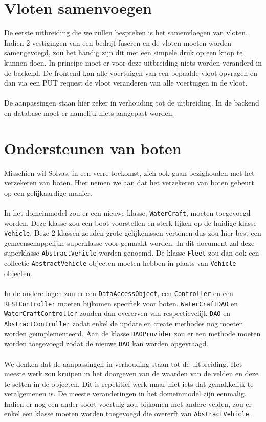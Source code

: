 \documentclass{article}
\begin{document}
	
\section{Vloten samenvoegen}

De eerste uitbreiding die we zullen bespreken is het samenvloegen van vloten. Indien 2 vestigingen van een bedrijf fuseren en de vloten moeten worden samengevoegd, zou het handig zijn dit met een simpele druk op een knop te kunnen doen. In principe moet er voor deze uitbreiding niets worden veranderd in de backend. De frontend kan alle voertuigen van een bepaalde vloot opvragen en dan via een PUT request de vloot veranderen van alle voertuigen in de vloot.
\\
\\
De aanpassingen staan hier zeker in verhouding tot de uitbreiding. In de backend en database moet er namelijk niets aangepast worden.

\section{Ondersteunen van boten}
	
Misschien wil Solvas, in een verre toekomst, zich ook gaan bezighouden met het verzekeren van boten. Hier nemen we aan dat het verzekeren van boten gebeurt op een gelijkaardige manier.
\\
\\
In het domeinmodel zou er een nieuwe klasse, \verb|WaterCraft|, moeten toegevoegd worden. Deze klasse zou een boot voorstellen en sterk lijken op de huidige klasse \verb|Vehicle|. Deze 2 klassen zouden grote gelijkenissen vertonen dus zou hier best een gemeenschappelijke superklasse voor gemaakt worden. In dit document zal deze superklasse \verb|AbstractVehicle| worden genoemd. De klasse \verb|Fleet| zou dan ook een collectie \verb|AbstractVehicle| objecten moeten hebben in plaats van \verb|Vehicle| objecten.
\\
\\
In de andere lagen zou er een \verb|DataAccessObject|, een \verb|Controller| en een \verb|RESTController| moeten bijkomen specifiek voor boten. \verb|WaterCraftDAO| en \verb|WaterCraftController| zouden dan overerven van respectievelijk \verb|DAO| en \verb|AbstractController| zodat enkel de update en create methodes nog moeten worden geïmplementeerd. Aan de klasse \verb|DAOProvider| zou er een methode moeten worden toegevoegd zodat de nieuwe \verb|DAO| kan worden opgevraagd. 
\\
\\
We denken dat de aanpassingen in verhouding staan tot de uitbreiding. Het meeste werk zou kruipen in het doorgeven van de waarden van de velden en deze te setten in de objecten. Dit is repetitief werk maar niet iets dat gemakkelijk te veralgemenen is. De meeste veranderingen in het domeinmodel zijn eenmalig. Indien er nog een ander soort voertuig zou bijkomen met andere velden, zou er enkel een klasse moeten worden toegevoegd die overerft van \verb|AbstractVehicle|.
\end{document}
